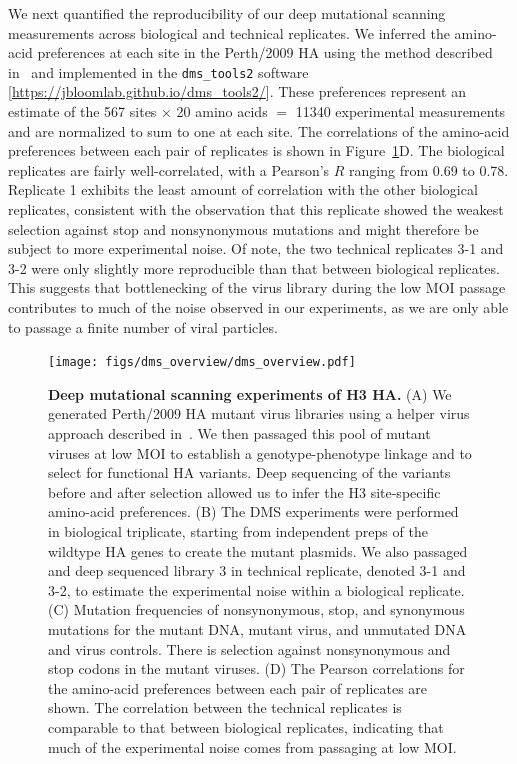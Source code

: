 \documentclass[11pt]{article}
\begin{document}
We next quantified the reproducibility of our deep mutational scanning measurements across biological and technical replicates. 
We inferred the amino-acid preferences at each site in the Perth/2009 HA using the method described in~\cite{bloom2015software} and implemented in the \texttt{dms\_tools2} software [\url{https://jbloomlab.github.io/dms_tools2/}].
These preferences represent an estimate of the 567 sites $\times$ 20 amino acids $=$ 11340 experimental measurements and are normalized to sum to one at each site.
The correlations of the amino-acid preferences between each pair of replicates is shown in Figure~\ref{fig:dms_overview}D.
The biological replicates are fairly well-correlated, with a Pearson's $R$ ranging from 0.69 to 0.78. 
Replicate 1 exhibits the least amount of correlation with the other biological replicates, consistent with the observation that this replicate showed the weakest selection against stop and nonsynonymous mutations and might therefore be subject to more experimental noise.
Of note, the two technical replicates 3-1 and 3-2 were only slightly more reproducible than that between biological replicates.
This suggests that bottlenecking of the virus library during the low MOI passage contributes to much of the noise observed in our experiments, as we are only able to passage a finite number of viral particles.

\begin{figure}
\centerline{\texttt{[image: figs/dms\_overview/dms\_overview.pdf]}}
\caption{\label{fig:dms_overview}
{\bf Deep mutational scanning experiments of H3 HA.}
(A) We generated Perth/2009 HA mutant virus libraries using a helper virus approach described in~\cite{doud2016accurate}.
We then passaged this pool of mutant viruses at low MOI to establish a genotype-phenotype linkage and to select for functional HA variants. 
Deep sequencing of the variants before and after selection allowed us to infer the H3 site-specific amino-acid preferences.
(B) The DMS experiments were performed in biological triplicate, starting from independent preps of the wildtype HA genes to create the mutant plasmids. 
We also passaged and deep sequenced library 3 in technical replicate, denoted 3-1 and 3-2, to estimate the experimental noise within a biological replicate.
(C) Mutation frequencies of nonsynonymous, stop, and synonymous mutations for the mutant DNA, mutant virus, and unmutated DNA and virus controls. 
There is selection against nonsynonymous and stop codons in the mutant viruses. 
(D) The Pearson correlations for the amino-acid preferences between each pair of replicates are shown. 
The correlation between the technical replicates is comparable to that between biological replicates, indicating that much of the experimental noise comes from passaging at low MOI. 
}
\end{figure}
\end{document}
